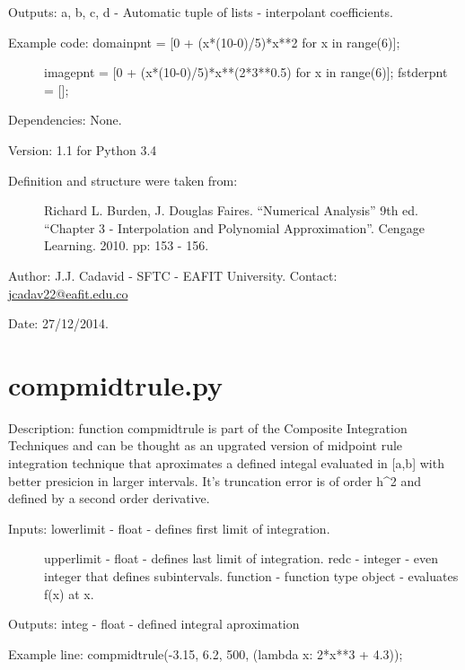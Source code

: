 \documentclass[letterpaper,10pt,oneside]{sphinxmanual}
\theoremstyle{plain}%
\theoremstyle{definition}%
\theoremstyle{remark}%
\begin{document}
Outputs: a, b, c, d - Automatic tuple of lists - interpolant coefficients.
\begin{description}
\item[{Example code: domainpnt = {[}0 + (x*(10-0)/5)*x**2 for x in range(6){]};}] \leavevmode
imagepnt = {[}0 + (x*(10-0)/5)*x**(2*3**0.5) for x in range(6){]};
fstderpnt = {[}{]};

\end{description}

Dependencies: None.

Version: 1.1 for Python 3.4
\begin{description}
\item[{Definition and structure were taken from:}] \leavevmode
Richard L. Burden, J. Douglas Faires. ``Numerical Analysis'' 9th ed.
``Chapter 3 - Interpolation and Polynomial Approximation''. 
Cengage Learning. 2010. pp: 153 - 156.

\end{description}

Author: J.J. Cadavid - SFTC - EAFIT University.
Contact: \href{mailto:jcadav22@eafit.edu.co}{jcadav22@eafit.edu.co}

Date: 27/12/2014.


\section{compmidtrule.py}
\label{code:module-compmidtrule}\label{code:compmidtrule-py}
Description: function compmidtrule is part of the Composite Integration
Techniques and can be thought as an upgrated version of midpoint rule
integration technique that aproximates a defined integal evaluated in {[}a,b{]}
with better presicion in larger intervals. It's truncation error is of order
h\textasciicircum{}2 and defined by a second order derivative.
\begin{description}
\item[{Inputs: lowerlimit - float - defines first limit of integration.}] \leavevmode
upperlimit - float - defines last limit of integration.
redc - integer - even integer that defines subintervals.
function - function type object - evaluates f(x) at x.

\end{description}

Outputs: integ - float - defined integral aproximation

Example line: compmidtrule(-3.15, 6.2, 500, (lambda x: 2*x**3 + 4.3));
\end{document}
